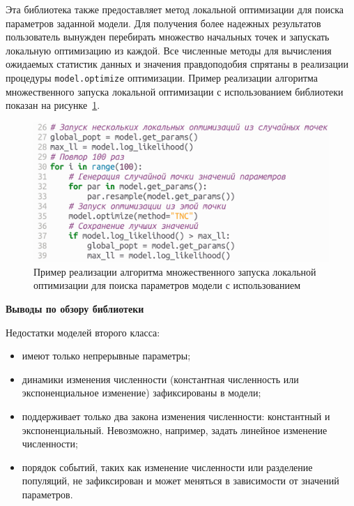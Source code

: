 \documentclass[a4paper,14pt,oneside,openany,article]{memoir}
\begin{document}
Эта библиотека также предоставляет метод локальной оптимизации для поиска параметров заданной модели.
Для получения более надежных результатов пользователь вынужден перебирать множество начальных точек и запускать локальную оптимизацию из каждой. 
Все численные методы для вычисления ожидаемых статистик данных и значения правдоподобия спрятаны в реализации процедуры \texttt{model.optimize} оптимизации.
Пример реализации алгоритма множественного запуска локальной оптимизации с использованием библиотеки \momi показан на рисунке~\ref{fig:momi:ls_run_several}.
\begin{figure}[h]
    \centering
    \includegraphics[width=0.6\linewidth]{images_2/momi_ls.png}
    \caption{Пример реализации алгоритма множественного запуска локальной оптимизации для поиска параметров модели с использованием \momi}
    \label{fig:momi:ls_run_several}
\end{figure}

\textbf{Выводы по обзору библиотеки \momi}

Недостатки моделей второго класса:
\begin{itemize}
    \item имеют только непрерывные параметры;
    \item динамики изменения численности (константная численность или экспоненциальное изменение) зафиксированы в модели;
    \item поддерживает только два закона изменения численности: константный и экспоненциальный. Невозможно, например, задать линейное изменение численности;
    \item порядок событий, таких как изменение численности или разделение популяций, не зафиксирован и может меняться в зависимости от значений параметров.\\
\end{itemize}
\end{document}
